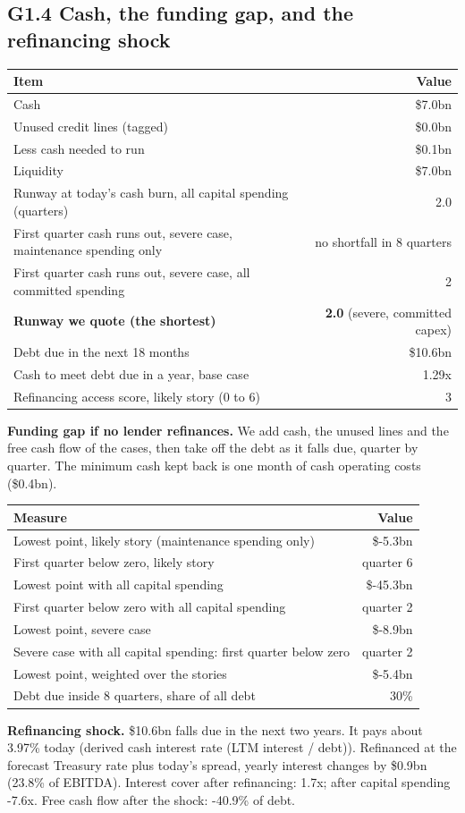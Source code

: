 \documentclass[11pt,a4paper]{article}
\begin{document}
\subsection*{G1.4 Cash, the funding gap, and the refinancing shock}
\begin{center}\footnotesize\setlength{\tabcolsep}{3.5pt}\begin{tabular}{@{}lr@{}}\toprule
Item & Value \\\midrule
Cash & \$7.0bn \\
Unused credit lines (tagged) & \$0.0bn \\
Less cash needed to run & \$0.1bn \\
Liquidity & \$7.0bn \\
Runway at today's cash burn, all capital spending (quarters) & 2.0 \\
First quarter cash runs out, severe case, maintenance spending only & no shortfall in 8 quarters \\
First quarter cash runs out, severe case, all committed spending & 2 \\
\textbf{Runway we quote (the shortest)} & \textbf{2.0} (severe, committed capex) \\
Debt due in the next 18 months & \$10.6bn \\
Cash to meet debt due in a year, base case & 1.29x \\
Refinancing access score, likely story (0 to 6) & 3 \\
\bottomrule\end{tabular}\end{center}
\textbf{Funding gap if no lender refinances.} We add cash, the unused lines and the free cash flow of the cases, then take off the debt as it falls due, quarter by quarter. The minimum cash kept back is one month of cash operating costs (\$0.4bn).
\begin{center}\footnotesize\setlength{\tabcolsep}{3.5pt}\begin{tabular}{@{}lr@{}}\toprule
Measure & Value \\\midrule
Lowest point, likely story (maintenance spending only) & \$-5.3bn \\
First quarter below zero, likely story & quarter 6 \\
Lowest point with all capital spending & \$-45.3bn \\
First quarter below zero with all capital spending & quarter 2 \\
Lowest point, severe case & \$-8.9bn \\
Severe case with all capital spending: first quarter below zero & quarter 2 \\
Lowest point, weighted over the stories & \$-5.4bn \\
Debt due inside 8 quarters, share of all debt & 30\% \\
\bottomrule\end{tabular}\end{center}
\textbf{Refinancing shock.} \$10.6bn falls due in the next two years. It pays about 3.97\% today (derived cash interest rate (LTM interest / debt)). Refinanced at the forecast Treasury rate plus today's spread, yearly interest changes by \$0.9bn (23.8\% of EBITDA). Interest cover after refinancing: 1.7x; after capital spending -7.6x. Free cash flow after the shock: -40.9\% of debt.
\end{document}
